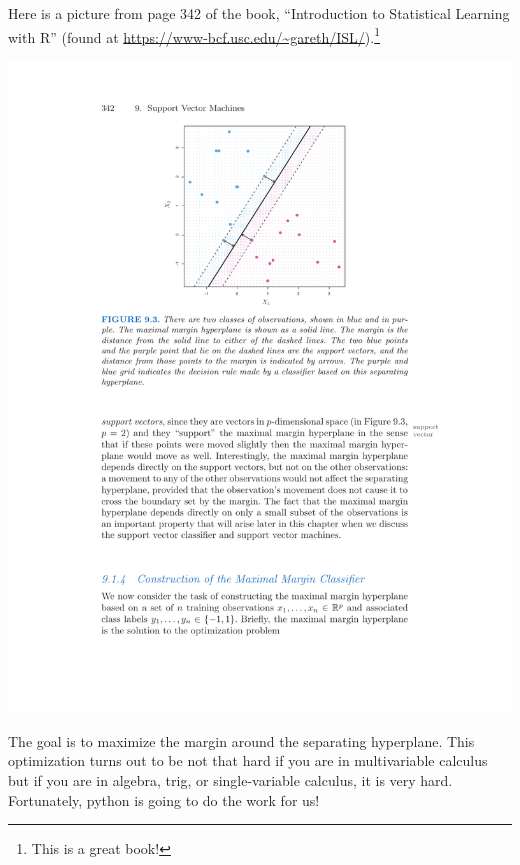 \documentclass[10pt]{article}
\begin{document}
Here is a picture from page 342 of the book, ``Introduction to Statistical Learning with R'' (found at \url{https://www-bcf.usc.edu/~gareth/ISL/}).\footnote{This is a great book!}
\begin{center}
\includegraphics{StatLearningMarginPage357.pdf}
\end{center}

The goal is to maximize the margin around the separating hyperplane. This optimization turns out to be not that hard if you are in multivariable calculus \smiley{} but if you are in algebra, trig, or single-variable calculus, it is very hard. Fortunately, python is going to do the work for us!
\end{document}
